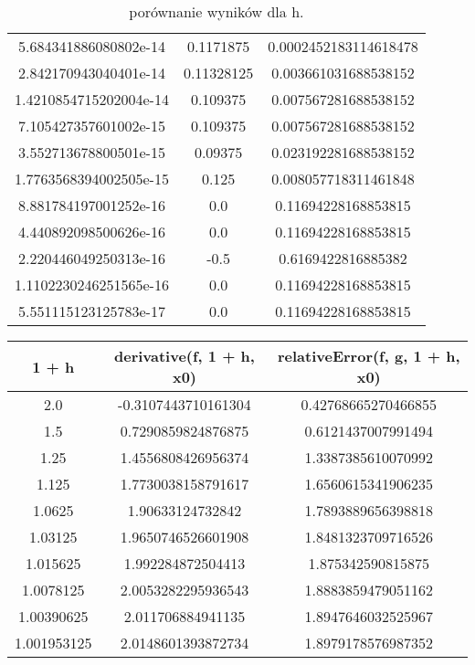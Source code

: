 \documentclass{article}
\begin{document}
\begin{center}
\begin{table}[h!]
\begin{tabular}{||c c c||}
     5.684341886080802e-14 & 0.1171875 & 0.0002452183114618478 \\ 
     2.842170943040401e-14 &  0.11328125 & 0.003661031688538152 \\ 
     1.4210854715202004e-14 & 0.109375 & 0.007567281688538152 \\ 
     7.105427357601002e-15 & 0.109375 & 0.007567281688538152 \\ 
     3.552713678800501e-15 & 0.09375 & 0.023192281688538152 \\ 
     1.7763568394002505e-15 & 0.125 & 0.008057718311461848 \\ 
     8.881784197001252e-16 & 0.0 & 0.11694228168853815 \\ 
     4.440892098500626e-16 & 0.0 & 0.11694228168853815 \\ 
     2.220446049250313e-16 & -0.5 & 0.6169422816885382 \\ 
     1.1102230246251565e-16 & 0.0 & 0.11694228168853815 \\ 
     5.551115123125783e-17 & 0.0 & 0.11694228168853815 \\ 
     \hline
     \end{tabular}
     \caption{porównanie wyników dla h.}
     \label{table:13}
     \end{table}
     \begin{table}[h!]
     \centering
     \begin{tabular}{||c c c||} 
     \hline
     \textbf{1 + h} & \textbf{derivative(f, 1 + h, x0)} & \textbf{relativeError(f, g, 1 + h, x0)} \\ [0.5ex]
     \hline\hline
     2.0 & -0.3107443710161304 & 0.42768665270466855 \\ 
     1.5 & 0.7290859824876875 & 0.6121437007991494 \\
     1.25 & 1.4556808426956374 & 1.3387385610070992 \\ 
     1.125 & 1.7730038158791617 & 1.6560615341906235 \\ 
     1.0625 & 1.90633124732842 & 1.7893889656398818 \\ 
     1.03125 & 1.9650746526601908 & 1.8481323709716526 \\ 
     1.015625 & 1.992284872504413 & 1.875342590815875 \\ 
     1.0078125 & 2.0053282295936543 & 1.8883859479051162 \\ 
     1.00390625 & 2.011706884941135 & 1.8947646032525967 \\ 
     1.001953125 & 2.0148601393872734 & 1.8979178576987352 \\ 

\end{tabular}
\end{table}
\end{center}
\end{document}
